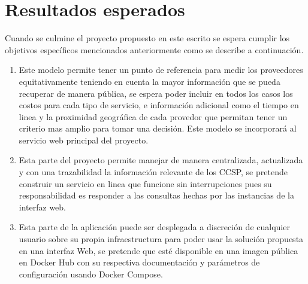 \chapter{Resultados esperados} %

\label{ch:resultados} %



Cuando se culmine el proyecto propuesto en este escrito se espera cumplir los objetivos específicos mencionados anteriormente como se describe a continuación.

\begin{enumerate}
  \item Este modelo permite tener un punto de referencia para medir los proveedores equitativamente teniendo en cuenta la mayor información que se pueda recuperar de manera pública, se espera poder incluir en todos los casos los costos para cada tipo de servicio, e información adicional como el tiempo en linea y la proximidad geográfica de cada provedor que permitan tener un criterio mas amplio para tomar una decisión. Este modelo se incorporará al servicio web principal del proyecto.
  
  \item Esta parte del proyecto permite manejar de manera centralizada, actualizada y con una trazabilidad la información relevante de los \acrshort{CCSP}, se pretende construir un servicio en linea que funcione sin interrupciones pues su responsabilidad es responder a las consultas hechas por las instancias de la interfaz web.
  
  \item Esta parte de la aplicación puede ser desplegada a discreción de cualquier usuario sobre su propia infraestructura para poder usar la solución propuesta en una interfaz Web, se pretende que esté disponible en una imagen pública en \gls{Docker Hub} con su respectiva documentación y parámetros de configuración usando \gls{Docker Compose}.
  
\end{enumerate}


      
